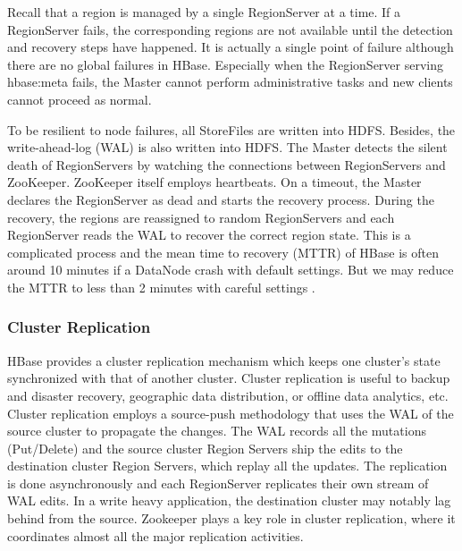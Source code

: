 \documentclass[11pt]{book}
\begin{document}
Recall that a region is managed by a single RegionServer at a time. If a RegionServer fails, the corresponding regions are not available until the detection and recovery steps have happened. It is actually a single point of failure although there are no global failures in HBase. Especially when the RegionServer serving hbase:meta fails, the Master cannot perform administrative tasks and new clients cannot proceed as normal.

To be resilient to node failures, all StoreFiles are written into HDFS. Besides, the write-ahead-log (WAL) is also written into HDFS. The Master detects the silent death of RegionServers by watching the connections between RegionServers and ZooKeeper. ZooKeeper itself employs heartbeats. On a timeout, the Master declares the RegionServer as dead and starts the recovery process. During the recovery, the regions are reassigned to random RegionServers and each RegionServer reads the WAL to recover the correct region state. This is a complicated process and the mean time to recovery (MTTR) of HBase is often around 10 minutes if a DataNode crash with default settings. But we may reduce the MTTR to less than 2 minutes with careful settings \cite{HBaseMTTR}.

\subsubsection{Cluster Replication}

HBase provides a cluster replication mechanism which keeps one cluster's state synchronized with that of another cluster. Cluster replication is useful to backup and disaster recovery, geographic data distribution, or offline data analytics, etc. Cluster replication employs a source-push methodology that uses the WAL of the source cluster to propagate the changes. The WAL records all the mutations (Put/Delete) and the source cluster Region Servers ship the edits to the destination cluster Region Servers, which replay all the updates. The replication is done asynchronously and each RegionServer replicates their own stream of WAL edits. In a write heavy application, the destination cluster may notably lag behind from the source. Zookeeper plays a key role in cluster replication, where it coordinates almost all the major replication activities.
\end{document}
